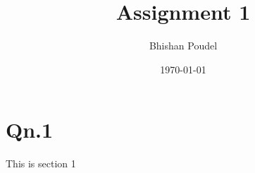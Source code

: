 \documentclass[12pt]{article}
\title{Assignment 1}
\author{Bhishan Poudel}
\date{\today}
\begin{document}
\maketitle
\section{Qn.1}
This is section 1
\end{document}
